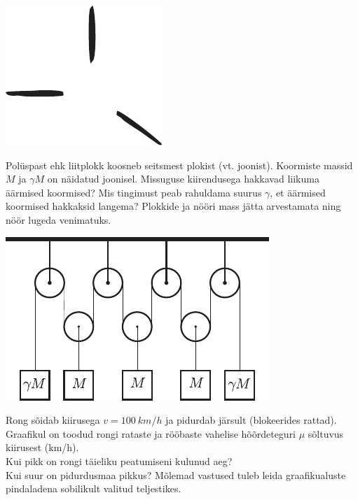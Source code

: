 \documentclass[10pt]{article}
\begin{document}
{\begin{center}
	\includegraphics[width=0.6\linewidth]{2008-v2g-06-yl}
\end{center}
\probend
\bigskip


Polüspast ehk liitplokk koosneb seitsmest plokist (vt. joonist). Koormiste massid $M$ ja $\gamma M$ on näidatud joonisel. Missuguse kiirendusega hakkavad liikuma äärmised koormised? Mis tingimust peab rahuldama suurus $\gamma$, et äärmised koormised hakkaksid langema? Plokkide ja nööri mass jätta arvestamata ning nöör lugeda venimatuks. 

\begin{center}
	\includegraphics[width=0.6\linewidth]{2008-v2g-09-yl}
\end{center}
\probend
\bigskip


Rong sõidab kiirusega $v = \SI{100}{km/h}$ ja pidurdab järsult (blokeerides rattad). Graafikul on toodud rongi rataste ja rööbaste vahelise hõõrdeteguri $\mu$ sõltuvus kiirusest (\si{km/h}).\\
\osa Kui pikk on rongi täieliku peatumiseni kulunud aeg?\\
\osa Kui suur on pidurdusmaa pikkus? Mõlemad vastused tuleb leida
graafikualuste pindaladena sobilikult valitud teljestikes.

}
\end{document}
